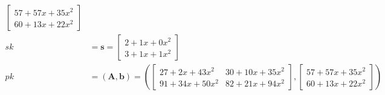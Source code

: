 \begin{align*}
\begin{bmatrix}
                   57+57x+35x^2 \\
                   60+13x+22x^2
                 \end{bmatrix}                                                                        \\
  sk         & = \textbf{s} =  \begin{bmatrix}2+ 1x + 0x^2 \\ 3+1x+1x^2 \end{bmatrix}                   \\
  pk         & = (\textbf{A}, \textbf{b}) = \left (
  \begin{bmatrix}27+2x+43x^2 & 30+10x+35x^2 \\ 91+34x+50x^2 & 82+21x+94x^2 \end{bmatrix},
  \begin{bmatrix}
      57+57x+35x^2 \\
      60+13x+22x^2
    \end{bmatrix} \right )                                                                                \\
\end{align*}

